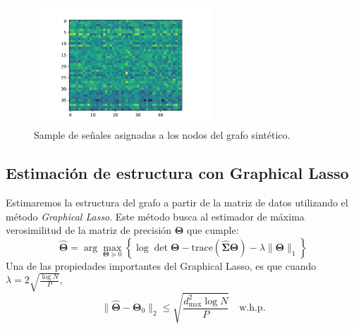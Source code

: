 \documentclass{article}
\begin{document}
\begin{figure}[htb]
    \centering
    \includegraphics[width=0.6\textwidth]{imagenes/signals_X_pseudoinverse.pdf}
    \caption{Sample de señales asignadas a los nodos del grafo sintético.}
    \label{fig:signals_X_pseudoinverse}
\end{figure}

\subsection{Estimación de estructura con Graphical Lasso}

Estimaremos la estructura del grafo a partir de la matriz de datos utilizando el método \textit{Graphical Lasso}. Este método busca al estimador 
de máxima verosimilitud de la matriz de precisión $\boldsymbol{\Theta}$ que cumple:
\begin{equation}
\hat{\boldsymbol{\Theta}} = \arg \max_{\boldsymbol{\Theta} \succeq 0} \left\{ \log \det \boldsymbol{\Theta} - \text{trace}(\hat{\boldsymbol{\Sigma}} \boldsymbol{\Theta}) - \lambda \|\boldsymbol{\Theta}\|_1 \right\}
\end{equation}
Una de las propiedades importantes del Graphical Lasso, es que cuando $\lambda =  2\sqrt{\frac{\log N}{P}}$,
\begin{equation*}
    \|\hat{\boldsymbol{\Theta}} - \boldsymbol{\Theta}_0\|_2 \leq \sqrt{\frac{d_{\max}^2 \log N}{P}} \quad \text{w.h.p.}
\end{equation*}
\end{document}
